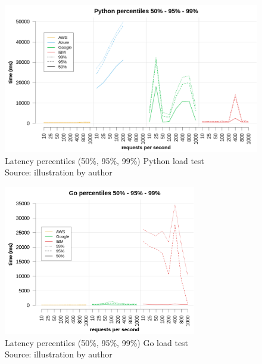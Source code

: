 \begin{figure}[b]
\begin{center}
\includegraphics[width=1\textwidth]{bilder/plot_percentile_latency_python.png}
\captionsetup{justification=centering, labelfont=bf}
\caption[Latency percentiles (50\%, 95\%, 99\%) Python load test]{Latency percentiles (50\%, 95\%, 99\%) Python load test\\Source: illustration by author}
\label{fig:loadtest_percentile_python}
\end{center}
\end{figure}

\newpage

\begin{figure}[t]
\begin{center}
\includegraphics[width=0.75\textwidth]{bilder/plot_percentile_latency_go.png}
\captionsetup{justification=centering, labelfont=bf}
\caption[Latency percentiles (50\%, 95\%, 99\%) Go load test]{Latency percentiles (50\%, 95\%, 99\%) Go load test\\Source: illustration by author}
\label{fig:loadtest_percentile_go}
\end{center}
\end{figure}

